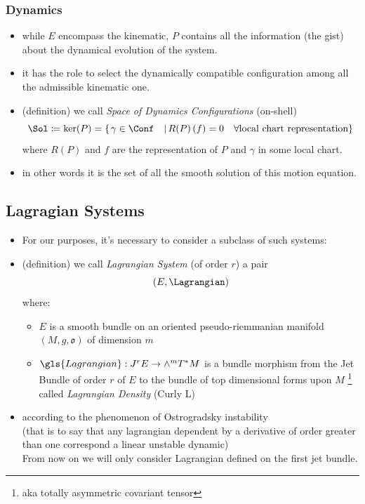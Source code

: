 \documentclass[a4paper,11pt]{scrartcl}
\begin{document}
    \subsubsection*{Dynamics}
    \begin{itemize}
        \item while $E$ encompass the kinematic, $P$ contains all the information (the gist) about the dynamical evolution of the system.
        \item it has the role to select the dynamically compatible configuration among all the admissible kinematic one.
        \item (definition) we call \emph{Space of Dynamics Configurations} (on-shell)
        $$             \Sol \coloneqq \ker(P) = \left\{\left. \gamma \in \Conf \quad\right\vert  R(P)\left(f\right) = 0 \quad \forall \textrm{local chart representation}\right\}$$
        where $R(P)$ and $f$ are the representation of $P$ and $\gamma$ in some local chart.
        \item in other words it is the set of all the smooth solution of this motion equation.
    \end{itemize}
    \subsection{Lagragian Systems}
    \begin{itemize}
        \item For our purposes, it's necessary to consider a subclass of such systems:
        \item (definition) we call \emph{Lagrangian System} (of order $r$) a pair $$(E,\Lagrangian)$$ where:
        \begin{itemize}
            \item $E$ is a smooth bundle on an oriented pseudo-riemmanian manifold $(M,g, \mathfrak{o})$ of dimension $m$
            \item $ \gls{Lagrangian} : J^r E \rightarrow \wedge^m T^*M$ is a bundle morphism from the Jet Bundle of order $r$ of $E$ to the bundle of top dimensional forms upon $M$ \footnote{aka totally asymmetric covariant tensor}\\
            called \emph{Lagrangian Density} (Curly L)
        \end{itemize}
        \item according to the phenomenon of Ostrogradsky instability\\
        (that is to say that any lagrangian dependent by a derivative of order greater than one correspond a linear unstable dynamic)\\
        From now on we will only consider Lagrangian defined on the first jet bundle.
    \end{itemize}
\end{document}
